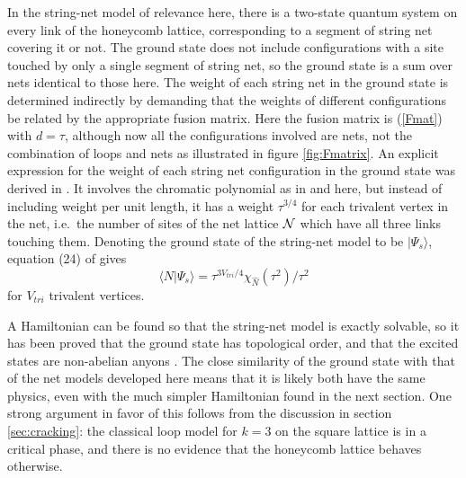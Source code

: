 \documentclass[11pt]{article}
\begin{document}
In the string-net model of relevance here, there is a two-state
quantum system on every link of the honeycomb lattice, corresponding
to a segment of string net covering it or not. The ground state does
not include configurations with a site touched by only a single
segment of string net, so the ground state is a sum over nets
identical to those here. The weight of each string net in the
ground state is determined indirectly by
demanding that the weights of different configurations be related by
the appropriate fusion matrix. Here the fusion matrix is (\ref{Fmat})
with $d=\tau$, although now all the configurations involved are nets,
not the combination of loops and nets as illustrated in figure
\ref{fig:Fmatrix}.  An explicit expression for the weight of each
string net configuration in the ground state was derived in
\cite{Fidkowski}. It involves the chromatic polynomial as in \cite{FF}
and here, but instead of including weight per unit length, it has a
weight $\tau^{3/4}$ for each trivalent vertex in the net, i.e.\ the
number of sites of the net lattice ${\cal N}$ which have all three
links touching them. Denoting the ground state of the string-net model
to be $|\Psi_s\rangle$, equation (24) of \cite{Fidkowski} gives
\begin{equation}
\langle N|\Psi_s\rangle = \tau^{3V_{tri}/4}
\chi_{\widehat{N}}(\tau^2)/\tau^2
\label{stringnet}
\end{equation}
for $V_{tri}$ trivalent vertices.


A Hamiltonian can be found so that the string-net model is exactly
solvable, so it has been proved that the ground state has topological
order, and that the excited states are non-abelian anyons
\cite{LevinWen}. The close similarity of the ground state with that of
the net models developed here 
means that it is likely both have the same physics, even
with the much simpler Hamiltonian found in the next section. One strong
argument in favor of this follows from the discussion in section
\ref{sec:cracking}: the classical loop model for $k=3$ on the square
lattice is in a critical phase, and there is no evidence that the
honeycomb lattice behaves otherwise.
\end{document}
